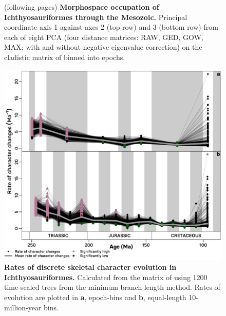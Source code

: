 \documentclass[british,a4paper]{article}
\begin{document}

\FloatBarrier

\begin{figure}[h]
    \caption[Morphospace occupation of Ichthyosauriformes through the Mesozoic]{(following pages) \textbf{Morphospace occupation of Ichthyosauriformes through the Mesozoic.} Principal coordinate axis 1 against axes 2 (top row) and 3 (bottom row) from each of eight PCA (four distance matrices: RAW, GED, GOW, MAX; with and without negative eigenvalue correction) on the cladistic matrix of \textcite{Moon2019a} binned into epochs.\label{fig:morphospace-plots}}
\end{figure}
\FloatBarrier




\begin{figure}[h]
    \includegraphics[width = \textwidth, center]{supp_figures/figS8-rates_MBLspaghetti}
    \caption[Rates of discrete skeletal character evolution in Ichthyosauriformes]{\textbf{Rates of discrete skeletal character evolution in Ichthyosauriformes.} Calculated from the matrix of \textcite{Moon2019a} using 1200 time-scaled trees from the minimum branch length method. Rates of evolution are plotted in \textbf{a}, epoch-bins and \textbf{b}, equal-length 10-million-year bins. \label{fig:mbl-discrete-rates}} 
\end{figure}
\FloatBarrier
 
\end{document}
